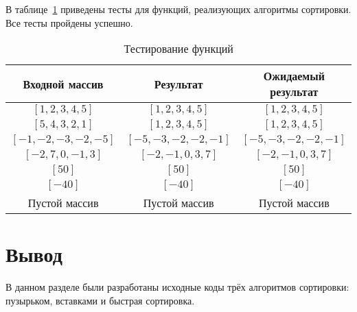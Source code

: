 

В таблице~\ref{tbl:test} приведены тесты для функций, реализующих алгоритмы сортировки. Все тесты пройдены успешно.

\begin{table}[h!]
    \begin{center}
        \begin{tabular}{|c|c|c|}
            \hline
            Входной массив & Результат & Ожидаемый результат \\
            \hline
            $[1, 2, 3, 4, 5]$ & $[1, 2, 3, 4, 5]$  & $[1, 2, 3, 4, 5]$\\\hline
            $[5, 4, 3, 2, 1]$  & $[1, 2, 3, 4, 5]$ & $[1, 2, 3, 4, 5]$\\\hline
            $[-1, -2, -3, -2, -5]$  & $[-5, -3, -2, -2, -1]$  & $[-5, -3, -2, -2, -1]$\\\hline
            $[-2, 7, 0, -1, 3]$  & $[-2, -1, 0, 3, 7]$  & $[-2, -1, 0, 3, 7]$\\\hline
            $[50]$  & $[50]$  & $[50]$\\\hline
            $[-40]$  & $[-40]$  & $[-40]$\\\hline
            Пустой массив  & Пустой массив  & Пустой массив\\
            \hline
        \end{tabular}
        \caption{\label{tbl:test}Тестирование функций}
    \end{center}
\end{table}

\section{Вывод}

В данном разделе были разработаны исходные коды трёх алгоритмов сортировки: пузырьком, вставками и быстрая сортировка.


